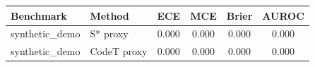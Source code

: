 \begin{tabular}{llcccc}
\toprule
Benchmark & Method & ECE & MCE & Brier & AUROC \\
\midrule
synthetic_demo & S* proxy & 0.000 & 0.000 & 0.000 & 0.000 \\
synthetic_demo & CodeT proxy & 0.000 & 0.000 & 0.000 & 0.000 \\
\bottomrule
\end{tabular}
